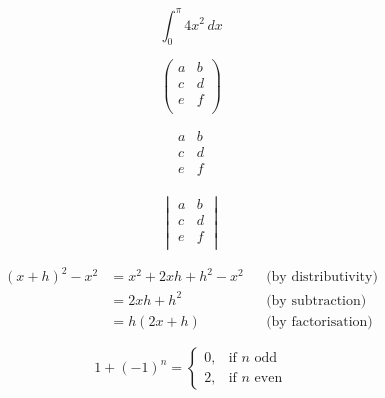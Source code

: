 \documentclass{article}
\begin{document}
$$\int_{0}^{\pi}4x^2\,dx$$

$$\begin{pmatrix}
a&b\\
c&d\\
e&f\\
\end{pmatrix}$$

$$\begin{matrix}
a&b\\
c&d\\
e&f\\
\end{matrix}$$

$$\begin{vmatrix}
a&b\\
c&d\\
e&f\\
\end{vmatrix}$$

\begin{align}
    (x+h)^2-x^2 & = x^2+2xh+h^2-x^2 && \text{(by distributivity)}\\
                & = 2xh+h^2         && \text{(by subtraction)}\\
                & = h(2x+h)         && \text{(by factorisation)}
\end{align}

$$
1+(-1)^n=\begin{cases}
            0, & \text{if $n$ odd}\\
            2, & \text{if $n$ even}
            \end{cases}
$$



\end{document}
